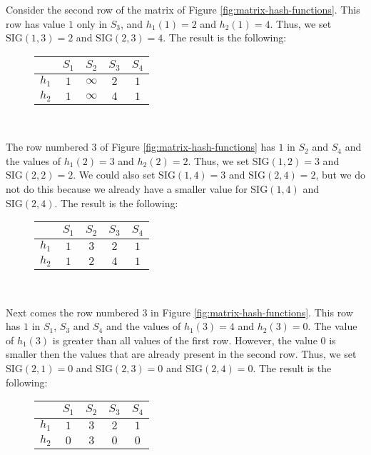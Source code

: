 Consider the second row of the matrix of Figure \ref{fig:matrix-hash-functions}. This row has value $1$ only in $S_3$, and $h_1(1) = 2$ and $h_2(1) = 4$. Thus, we set $\text{SIG}(1, 3) = 2$ and $\text{SIG}(2, 3) = 4$. The result is the following:

\begin{figure}[H]
\centering
\begin{tabular}{|c||c|c|c|c|}
  \hline
   & $S_1$ & $S_2$ & $S_3$ & $S_4$\\
  \hline
  $h_1$ & $1$ & $\infty$ & $2$ & $1$ \\ 
  $h_2$ & $1$ & $\infty$ & $4$ & $1$ \\
  \hline
\end{tabular}
\captionsetup{justification=centering}\\
\label{fig:sig-matrix-2}
\end{figure}

The row numbered 3 of Figure \ref{fig:matrix-hash-functions} has $1$ in $S_2$ and $S_4$ and the values of $h_1(2) = 3$ and $h_2(2) = 2$. Thus, we set $\text{SIG}(1, 2) = 3$ and $\text{SIG}(2, 2) = 2$. We could also set $\text{SIG}(1, 4) = 3$ and $\text{SIG}(2, 4) = 2$, but we do not do this because we already have a smaller value for $\text{SIG}(1, 4)$ and $\text{SIG}(2, 4)$. The result is the following:

\begin{figure}[H]
\centering
\begin{tabular}{|c||c|c|c|c|}
  \hline
   & $S_1$ & $S_2$ & $S_3$ & $S_4$\\
  \hline
  $h_1$ & $1$ & $3$ & $2$ & $1$ \\ 
  $h_2$ & $1$ & $2$ & $4$ & $1$ \\
  \hline
\end{tabular}
\captionsetup{justification=centering}\\
\label{fig:sig-matrix-3}
\end{figure}

Next comes the row numbered 3 in Figure \ref{fig:matrix-hash-functions}. This row has $1$ in $S_1$, $S_3$ and $S_4$ and the values of $h_1(3) = 4$ and $h_2(3) = 0$. The value of $h_1(3)$ is greater than all values of the first row. However, the value $0$ is smaller then the values that are already present in the second row. Thus, we set $\text{SIG}(2, 1) = 0$ and $\text{SIG}(2, 3) = 0$ and $\text{SIG}(2, 4) = 0$. The result is the following:

\begin{figure}[H]
\centering
\begin{tabular}{|c||c|c|c|c|}
  \hline
   & $S_1$ & $S_2$ & $S_3$ & $S_4$\\
  \hline
  $h_1$ & $1$ & $3$ & $2$ & $1$ \\ 
  $h_2$ & $0$ & $3$ & $0$ & $0$ \\
  \hline
\end{tabular}
\captionsetup{justification=centering}\\
\label{fig:sig-matrix-3}
\end{figure}

